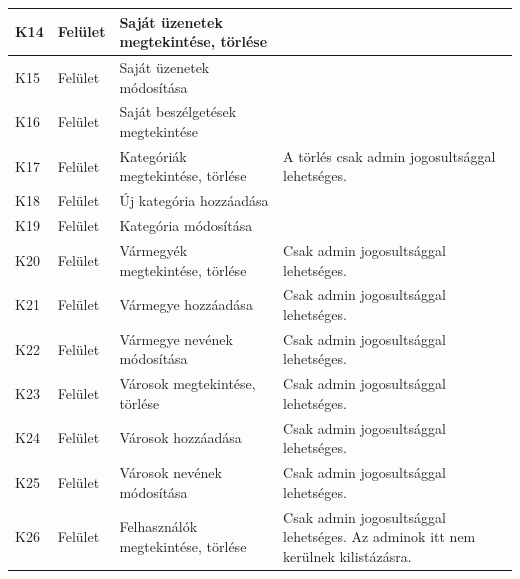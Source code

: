 \documentclass[]{thesis-ekf}
\theoremstyle{definition}
\theoremstyle{remark}
\begin{document}
\begin{longtable}{|l|l|p{3cm}|p{8cm}|}
				K14 & Felület & Saját üzenetek megtekintése, törlése & ~ \\ \hline
				K15 & Felület & Saját üzenetek módosítása & ~ \\ \hline
				K16 & Felület & Saját beszélgetések megtekintése & ~ \\ \hline
				K17 & Felület & Kategóriák megtekintése, törlése & A törlés csak admin jogosultsággal lehetséges. \\ \hline
				K18 & Felület & Új kategória hozzáadása & ~ \\ \hline
				K19 & Felület & Kategória módosítása & ~ \\ \hline
				K20 & Felület & Vármegyék megtekintése, törlése & Csak admin jogosultsággal lehetséges. \\ \hline
				K21 & Felület & Vármegye hozzáadása & Csak admin jogosultsággal lehetséges. \\ \hline
				K22 & Felület & Vármegye nevének módosítása & Csak admin jogosultsággal lehetséges. \\ \hline
				K23 & Felület & Városok megtekintése, törlése & Csak admin jogosultsággal lehetséges. \\ \hline
				K24 & Felület & Városok hozzáadása & Csak admin jogosultsággal lehetséges. \\ \hline
				K25 & Felület & Városok nevének módosítása & Csak admin jogosultsággal lehetséges. \\ \hline
				K26 & Felület & Felhasználók megtekintése, törlése & Csak admin jogosultsággal lehetséges. Az adminok itt nem kerülnek kilistázásra. \\ \hline
				
			\end{longtable}
\end{document}

